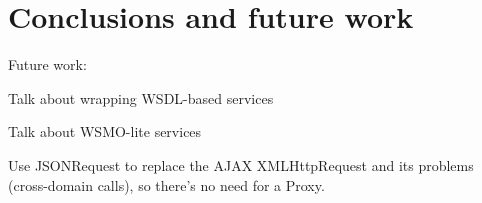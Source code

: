 
\section{Conclusions and future work}

Future work:

Talk about wrapping WSDL-based services

Talk about WSMO-lite services

Use JSONRequest to replace the AJAX XMLHttpRequest and its problems (cross-domain calls), so there's no need for a Proxy.

